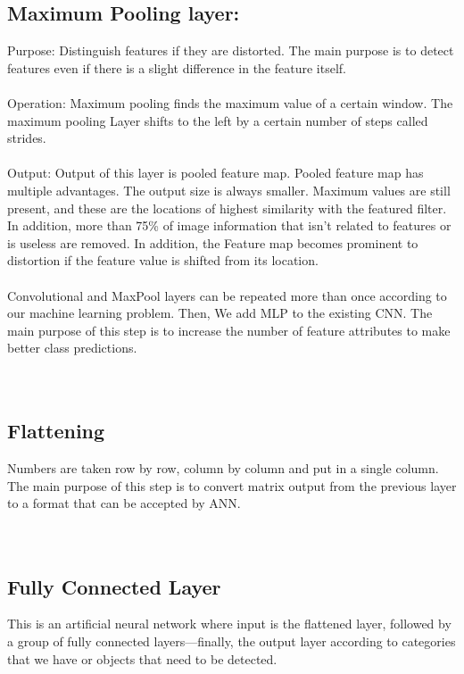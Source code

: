 \documentclass[12pt,letterpaper, onecolumn]{exam}
\begin{document}
  \subsection{ Maximum Pooling layer:}
    Purpose: Distinguish features if they are distorted. The main purpose is to detect features even if there is a slight difference in the feature itself.\\\\

  Operation: Maximum pooling finds the maximum value of a certain window. The maximum pooling Layer shifts to the left by a certain number of steps called strides.\\\\

  Output: Output of this layer is pooled feature map. Pooled feature map has multiple advantages. The output size is always smaller. Maximum values are still present, and these    are the locations of highest similarity with the featured filter. In addition, more than 75\% of image information that isn’t related to features or is useless are removed. In    addition, the Feature map becomes prominent to distortion if the feature value is shifted from its location.\\\\
  
  Convolutional and MaxPool layers can be repeated more than once according to our machine learning problem. Then, We add MLP to the existing CNN. The main purpose of this step    is to increase the number of feature attributes to make better class predictions.\\\\\\
  
  \subsection{Flattening}
  Numbers are taken row by row, column by column and put in a single column. The main purpose of this step is to convert matrix output from the previous layer to a format that     can be accepted by ANN.\\\\\\
  
  \subsection{Fully Connected Layer}
  This is an artificial neural network where input is the flattened layer, followed by a group of fully connected layers—finally, the output layer according to categories that     we have or objects that need to be detected.
    
\end{document}
